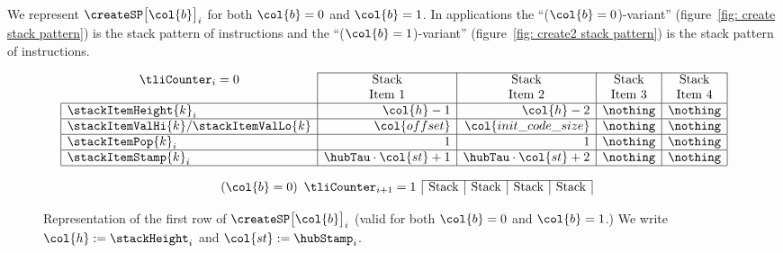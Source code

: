 


We represent $\createSP\big[\col{b}\big]_{i}$ for both $\col{b} = 0$ and $\col{b} = 1$. In applications
the ``($\col{b} = 0$)-variant'' (figure~\ref{fig: create stack pattern}) is the stack pattern of  instructions and
the ``($\col{b} = 1$)-variant'' (figure~\ref{fig: create2 stack pattern}) is the stack pattern of  instructions.
\begin{figure}[h!]
\[
	\begin{array}{|l|r|r|c|c|}
	\cline{2-5}
	\multicolumn{1}{c|}{\tliCounter_{i} = 0} & \multicolumn{1}{c|}{\text{Stack}}  & \multicolumn{1}{c|}{\text{Stack}}  & \multicolumn{1}{c|}{\text{Stack}}  & \multicolumn{1}{c|}{\text{Stack}}  \\
	\multicolumn{1}{c|}{}                    & \multicolumn{1}{c|}{\text{Item 1}} & \multicolumn{1}{c|}{\text{Item 2}} & \multicolumn{1}{c|}{\text{Item 3}} & \multicolumn{1}{c|}{\text{Item 4}} \\ \hline
	\stackItemHeight{k}_{i}                  & \col{h} - 1                        & \col{h} - 2                        & \nothing                           & \nothing                           \\ \hline
	\stackItemValHi{k}/\stackItemValLo{k}    & \col{offset}                       & \col{init\_code\_size}             & \nothing                           & \nothing                           \\ \hline
	\stackItemPop{k}_{i}                     & 1                                  & 1                                  & \nothing                           & \nothing                           \\ \hline
	\stackItemStamp{k}_{i}                   & \hubTau \cdot \col{st} + 1         & \hubTau \cdot \col{st} + 2         & \nothing                           & \nothing                           \\ \hline
	\end{array}
\]
\caption{%
Representation of the first row of $\createSP\big[\col{b}\big]_{i}$ (valid for both $\col{b} = 0$ and $\col{b} = 1$.)
We write $\col{h} := \stackHeight_{i}$ and $\col{st} := \hubStamp_{i}$.}
\[
	\tag{$\col{b} = 0$}
	\begin{array}{|l|c|c|r|r|}
	\cline{2-5}
	\multicolumn{1}{c|}{\tliCounter_{i + 1} = 1}            & \multicolumn{1}{c|}{\text{Stack}}  & \multicolumn{1}{c|}{\text{Stack}}  & \multicolumn{1}{c|}{\text{Stack}}  & \multicolumn{1}{c|}{\text{Stack}}  \\

\end{array}\]
\end{figure}
